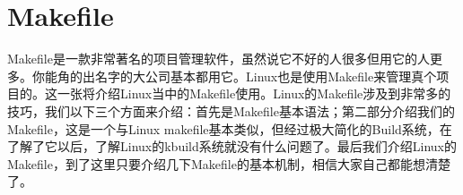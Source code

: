 \chapter{Makefile}
Makefile是一款非常著名的项目管理软件，虽然说它不好的人很多但用它的人更多。你能角的出名字的大公司基本都用它。Linux也是使用Makefile来管理真个项目的。这一张将介绍Linux当中的Makefile使用。Linux的Makefile涉及到非常多的技巧，我们以下三个方面来介绍：首先是Makefile基本语法；第二部分介绍我们的Makefile，这是一个与Linux makefile基本类似，但经过极大简化的Build系统，在了解了它以后，了解Linux的kbuild系统就没有什么问题了。最后我们介绍Linux的Makefile，到了这里只要介绍几下Makefile的基本机制，相信大家自己都能想清楚了。


